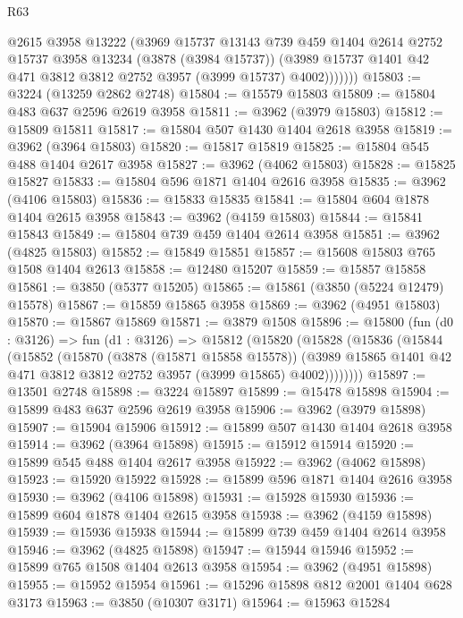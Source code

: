 \begin{lexlean}{R63}
\begin{coremodule}
              @2615
              @3958
              @13222
              (@3969
                @15737
                @13143
                @739
                @459
                @1404
                @2614
                @2752
                @15737
                @3958
                @13234
                (@3878 (@3984 @15737))
                (@3989 @15737 @1401 @42 @471 @3812 @3812 @2752 @3957 (@3999 @15737) @4002)))))))
@15803 := @3224 (@13259 @2862 @2748)
@15804 := @15579 @15803
@15809 := @15804 @483 @637 @2596 @2619 @3958
@15811 := @3962 (@3979 @15803)
@15812 := @15809 @15811
@15817 := @15804 @507 @1430 @1404 @2618 @3958
@15819 := @3962 (@3964 @15803)
@15820 := @15817 @15819
@15825 := @15804 @545 @488 @1404 @2617 @3958
@15827 := @3962 (@4062 @15803)
@15828 := @15825 @15827
@15833 := @15804 @596 @1871 @1404 @2616 @3958
@15835 := @3962 (@4106 @15803)
@15836 := @15833 @15835
@15841 := @15804 @604 @1878 @1404 @2615 @3958
@15843 := @3962 (@4159 @15803)
@15844 := @15841 @15843
@15849 := @15804 @739 @459 @1404 @2614 @3958
@15851 := @3962 (@4825 @15803)
@15852 := @15849 @15851
@15857 := @15608 @15803 @765 @1508 @1404 @2613
@15858 := @12480 @15207
@15859 := @15857 @15858
@15861 := @3850 (@5377 @15205)
@15865 := @15861 (@3850 (@5224 @12479) @15578)
@15867 := @15859 @15865 @3958
@15869 := @3962 (@4951 @15803)
@15870 := @15867 @15869
@15871 := @3879 @1508
@15896 := @15800
    (fun (d0 : @3126) =>
    fun (d1 : @3126) =>
    @15812
      (@15820
        (@15828
          (@15836
            (@15844
              (@15852
                (@15870
                  (@3878 (@15871 @15858 @15578))
                  (@3989 @15865 @1401 @42 @471 @3812 @3812 @2752 @3957 (@3999 @15865) @4002))))))))
@15897 := @13501 @2748
@15898 := @3224 @15897
@15899 := @15478 @15898
@15904 := @15899 @483 @637 @2596 @2619 @3958
@15906 := @3962 (@3979 @15898)
@15907 := @15904 @15906
@15912 := @15899 @507 @1430 @1404 @2618 @3958
@15914 := @3962 (@3964 @15898)
@15915 := @15912 @15914
@15920 := @15899 @545 @488 @1404 @2617 @3958
@15922 := @3962 (@4062 @15898)
@15923 := @15920 @15922
@15928 := @15899 @596 @1871 @1404 @2616 @3958
@15930 := @3962 (@4106 @15898)
@15931 := @15928 @15930
@15936 := @15899 @604 @1878 @1404 @2615 @3958
@15938 := @3962 (@4159 @15898)
@15939 := @15936 @15938
@15944 := @15899 @739 @459 @1404 @2614 @3958
@15946 := @3962 (@4825 @15898)
@15947 := @15944 @15946
@15952 := @15899 @765 @1508 @1404 @2613 @3958
@15954 := @3962 (@4951 @15898)
@15955 := @15952 @15954
@15961 := @15296 @15898 @812 @2001 @1404 @628 @3173
@15963 := @3850 (@10307 @3171)
@15964 := @15963 @15284

\end{coremodule}
\end{lexlean}
